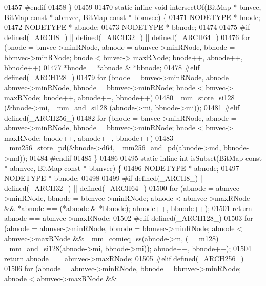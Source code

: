 \begin{DoxyCode}
{01457 \textcolor{preprocessor}{#endif}
01458 \}
01459 
01470 \textcolor{keyword}{static} \textcolor{keyword}{inline} \textcolor{keywordtype}{void} intersectOf(BitMap * bmvec, BitMap \textcolor{keyword}{const} * abmvec, BitMap \textcolor{keyword}{const} * bbmvec) \{
01471         NODETYPE * bnode;
01472         NODETYPE * abnode;
01473         NODETYPE * bbnode;
01474 
01475 \textcolor{preprocessor}{#if defined(\_ARCH8\_) || defined(\_ARCH32\_) || defined(\_ARCH64\_)}
01476         \textcolor{keywordflow}{for} (bnode = bmvec->minRNode, abnode = abmvec->minRNode, bbnode = bbmvec->minRNode; bnode < bmvec->
      maxRNode; bnode++, abnode++, bbnode++)
01477                 *bnode = *abnode & *bbnode;
01478 \textcolor{preprocessor}{#elif defined(\_ARCH128\_)}
01479         \textcolor{keywordflow}{for} (bnode = bmvec->minRNode, abnode = abmvec->minRNode, bbnode = bbmvec->minRNode; bnode < bmvec->
      maxRNode; bnode++, abnode++, bbnode++)
01480                 \_mm\_store\_si128 (&bnode->mi, \_mm\_and\_si128 (abnode->mi, bbnode->mi));
01481 \textcolor{preprocessor}{#elif defined(\_ARCH256\_)}
01482         \textcolor{keywordflow}{for} (bnode = bmvec->minRNode, abnode = abmvec->minRNode, bbnode = bbmvec->minRNode; bnode < bmvec->
      maxRNode; bnode++, abnode++, bbnode++)
01483                 \_mm256\_store\_pd(&bnode->d64, \_mm256\_and\_pd(abnode->md, bbnode->md));
01484 \textcolor{preprocessor}{#endif}
01485 \}
01486 
01495 \textcolor{keyword}{static} \textcolor{keyword}{inline} \textcolor{keywordtype}{int} isSubset(BitMap \textcolor{keyword}{const} * abmvec, BitMap \textcolor{keyword}{const} * bbmvec) \{
01496         NODETYPE * abnode;
01497         NODETYPE * bbnode;
01498 
01499 \textcolor{preprocessor}{#if defined(\_ARCH8\_) || defined(\_ARCH32\_) || defined(\_ARCH64\_)}
01500         \textcolor{keywordflow}{for} (abnode = abmvec->minRNode, bbnode = bbmvec->minRNode; abnode < abmvec->maxRNode && *abnode == 
      (*abnode & *bbnode); abnode++, bbnode++);
01501         \textcolor{keywordflow}{return} abnode == abmvec->maxRNode;
01502 \textcolor{preprocessor}{#elif defined(\_ARCH128\_)}
01503         \textcolor{keywordflow}{for} (abnode = abmvec->minRNode, bbnode = bbmvec->minRNode; abnode < abmvec->maxRNode && 
      \_mm\_comieq\_ss(abnode->m, (\_\_m128) \_mm\_and\_si128(abnode->mi, bbnode->mi)); abnode++, bbnode++);
01504         \textcolor{keywordflow}{return} abnode == abmvec->maxRNode;
01505 \textcolor{preprocessor}{#elif defined(\_ARCH256\_)}
01506         \textcolor{keywordflow}{for} (abnode = abmvec->minRNode, bbnode = bbmvec->minRNode; abnode < abmvec->maxRNode && 
}
\end{DoxyCode}
